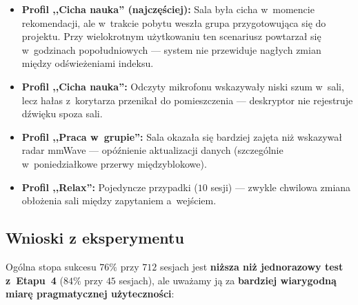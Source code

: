 \documentclass[14pt,a4paper]{extarticle}
\begin{document}
\begin{itemize}
    \item \textbf{Profil ,,Cicha nauka'' (najczęściej):} Sala była cicha w~momencie rekomendacji, ale w~trakcie pobytu weszła grupa przygotowująca się do projektu. Przy wielokrotnym użytkowaniu ten scenariusz powtarzał się w~godzinach popołudniowych --- system nie przewiduje nagłych zmian między odświeżeniami indeksu.
    \item \textbf{Profil ,,Cicha nauka'':} Odczyty mikrofonu wskazywały niski szum w~sali, lecz hałas z~korytarza przenikał do pomieszczenia --- deskryptor nie rejestruje dźwięku spoza sali.
    \item \textbf{Profil ,,Praca w~grupie'':} Sala okazała się bardziej zajęta niż wskazywał radar mmWave --- opóźnienie aktualizacji danych (szczególnie w~poniedziałkowe przerwy międzyblokowe).
    \item \textbf{Profil ,,Relax'':} Pojedyncze przypadki ($10$ sesji) --- zwykle chwilowa zmiana obłożenia sali między zapytaniem a~wejściem.
\end{itemize}

\subsection{Wnioski z eksperymentu}

Ogólna stopa sukcesu $76\%$ przy $712$ sesjach jest \textbf{niższa niż jednorazowy test z~Etapu~4} ($84\%$ przy $45$ sesjach), ale uważamy ją za \textbf{bardziej wiarygodną miarę pragmatycznej użyteczności}:
\end{document}
